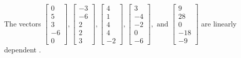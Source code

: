 \begin{exercise}
\begin{exerciseStatement}
  \end{exerciseStatement}
  \begin{exerciseAnswer}
   The vectors \(\left[\begin{array}{r}
0 \\
5 \\
3 \\
-6 \\
0
\end{array}\right] , \left[\begin{array}{r}
-3 \\
-6 \\
2 \\
2 \\
3
\end{array}\right] , \left[\begin{array}{r}
4 \\
1 \\
4 \\
4 \\
-2
\end{array}\right] , \left[\begin{array}{r}
3 \\
-4 \\
-2 \\
0 \\
-6
\end{array}\right] , \text{ and } \left[\begin{array}{r}
9 \\
28 \\
0 \\
-18 \\
-9
\end{array}\right]\) are 
  	 linearly dependent  .
  


  \end{exerciseAnswer}
\end{exercise}